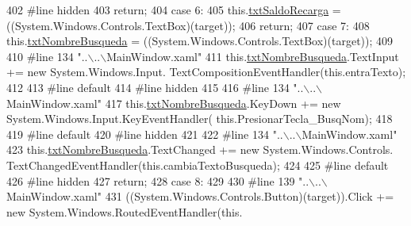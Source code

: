 \begin{DoxyCode}
402 \textcolor{preprocessor}{}\textcolor{preprocessor}{            #line hidden}
403 \textcolor{preprocessor}{}            \textcolor{keywordflow}{return};
404             \textcolor{keywordflow}{case} 6:
405             this.\hyperlink{class_proyecto___integrador__3_1_1_main_window_aeb68364159bb1ed1dbf417a205fd3519}{txtSaldoRecarga} = ((System.Windows.Controls.TextBox)(target));
406             \textcolor{keywordflow}{return};
407             \textcolor{keywordflow}{case} 7:
408             this.\hyperlink{class_proyecto___integrador__3_1_1_main_window_a8b7a97d30e0788fb2ff72eaee1d0ab88}{txtNombreBusqueda} = ((System.Windows.Controls.TextBox)(target));
409             
410 \textcolor{preprocessor}{            #line 134 "..\(\backslash\)..\(\backslash\)MainWindow.xaml"}
411 \textcolor{preprocessor}{}            this.\hyperlink{class_proyecto___integrador__3_1_1_main_window_a8b7a97d30e0788fb2ff72eaee1d0ab88}{txtNombreBusqueda}.TextInput += \textcolor{keyword}{new} System.Windows.Input.
      TextCompositionEventHandler(this.entraTexto);
412             
413 \textcolor{preprocessor}{            #line default}
414 \textcolor{preprocessor}{}\textcolor{preprocessor}{            #line hidden}
415 \textcolor{preprocessor}{}            
416 \textcolor{preprocessor}{            #line 134 "..\(\backslash\)..\(\backslash\)MainWindow.xaml"}
417 \textcolor{preprocessor}{}            this.\hyperlink{class_proyecto___integrador__3_1_1_main_window_a8b7a97d30e0788fb2ff72eaee1d0ab88}{txtNombreBusqueda}.KeyDown += \textcolor{keyword}{new} System.Windows.Input.KeyEventHandler(
      this.PresionarTecla\_BusqNom);
418             
419 \textcolor{preprocessor}{            #line default}
420 \textcolor{preprocessor}{}\textcolor{preprocessor}{            #line hidden}
421 \textcolor{preprocessor}{}            
422 \textcolor{preprocessor}{            #line 134 "..\(\backslash\)..\(\backslash\)MainWindow.xaml"}
423 \textcolor{preprocessor}{}            this.\hyperlink{class_proyecto___integrador__3_1_1_main_window_a8b7a97d30e0788fb2ff72eaee1d0ab88}{txtNombreBusqueda}.TextChanged += \textcolor{keyword}{new} System.Windows.Controls.
      TextChangedEventHandler(this.cambiaTextoBusqueda);
424             
425 \textcolor{preprocessor}{            #line default}
426 \textcolor{preprocessor}{}\textcolor{preprocessor}{            #line hidden}
427 \textcolor{preprocessor}{}            \textcolor{keywordflow}{return};
428             \textcolor{keywordflow}{case} 8:
429             
430 \textcolor{preprocessor}{            #line 139 "..\(\backslash\)..\(\backslash\)MainWindow.xaml"}
431 \textcolor{preprocessor}{}            ((System.Windows.Controls.Button)(target)).Click += \textcolor{keyword}{new} System.Windows.RoutedEventHandler(\textcolor{keyword}{this}.

\end{DoxyCode}
